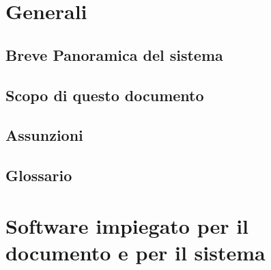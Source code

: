 \section{Generali}
\subsection{Breve Panoramica del sistema}
\subsection{Scopo di questo documento}
\subsection{Assunzioni}
\subsection{Glossario}
\section{Software impiegato per il documento e per il sistema}